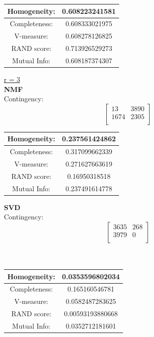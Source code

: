 \documentclass{report}
\begin{document}
\begin{center}
\begin{tabu}{| c | c |}
\hline
Homogeneity:		& 0.608223241581 \\
\hline
Completeness:		& 0.608333021975 \\
\hline
V-measure:			& 0.608278126825 \\
\hline
RAND score:			& 0.713926529273 \\
\hline
Mutual Info:		& 0.608187374307 \\
\hline
\end{tabu}
\end{center}


\underline{r = 3} \\
\textbf{NMF} \\
Contingency: \[
\begin{bmatrix}
13 			& 3890 \\
1674		& 2305 \\
\end{bmatrix}
\]

\begin{center}
\begin{tabu}{| c | c |}
\hline
Homogeneity: 		& 0.237561424862 \\
\hline
Completeness: 		& 0.317099662339 \\
\hline
V-measure:			& 0.271627663619 \\
\hline
RAND score: 		& 0.16950318518 \\
\hline
Mutual Info: 		& 0.237491614778 \\
\hline
\end{tabu}
\end{center}

\textbf{SVD} \\

Contingency: \[
\begin{bmatrix}
3635  		& 268 \\
3979    	& 0   \\
\end{bmatrix}
\]
\\ \\

\begin{center}
\begin{tabu}{| c | c |}
\hline
Homogeneity: 		& 0.0353596802034 \\
\hline 
Completeness: 		& 0.165160546781 \\
\hline
V-measure: 			& 0.0582487283625 \\
\hline
RAND score: 		& 0.00593193880668 \\
\hline
Mutual Info: 		& 0.0352712181601 \\
\hline
\end{tabu}
\end{center}
\end{document}
